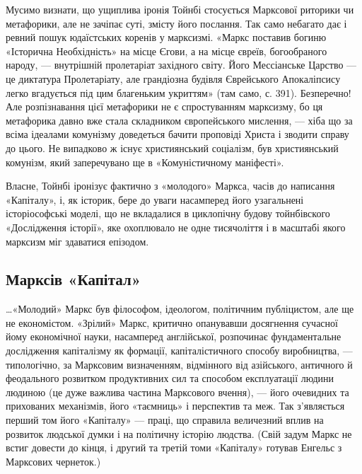 Мусимо визнати, що ущиплива іронія Тойнбі стосується Марксової 
риторики чи метафорики, але не зачіпає суті, змісту його послання. Так 
само небагато дає і ревний пошук юдаїстських коренів у марксизмі. 
«Маркс поставив богиню «Історична Необхідність» на місце Єгови, а на 
місце євреїв, богообраного народу, — внутрішній пролетаріат 
західного світу. Його Мессіанське Царство — це диктатура 
Пролетаріату, але грандіозна будівля Єврейського Апокаліпсису легко 
вгадується під цим благеньким укриттям» (там само, с. 391). Безперечно! 
Але розпізнавання цієї метафорики не є спростуванням марксизму, бо ця 
метафорика давно вже стала складником європейського мислення, — хіба 
що за всіма ідеалами комунізму доведеться бачити проповіді Христа і 
зводити справу до цього. Не випадково ж існує християнський соціалізм, 
був християнський комунізм, який заперечувано ще в «Комуністичному 
маніфесті». 


Власне, Тойнбі іронізує фактично з «молодого» Маркса, часів до 
написання «Капіталу», і, як історик, бере до уваги насамперед його 
узагальнені історіософські моделі, що не вкладалися в циклопічну 
будову тойнбівского «Дослідження історії», яке охоплювало не одне 
тисячоліття і в масштабі якого марксизм міг здаватися епізодом.


\subsection*{Марксів «Капітал»}


\ldots{}«Молодий» Маркс був філософом, ідеологом, політичним публіцистом, 
але ще не економістом. «Зрілий» Маркс, критично опанувавши досягнення 
сучасної йому економічної науки, насамперед англійської, розпочинає 
фундаментальне дослідження капіталізму як формації, 
капіталістичного способу виробництва, — типологічно, за Марксовим 
визначенням, відмінного від азійського, античного й феодального 
розвитком продуктивних сил та способом експлуатації людини людиною 
(це дуже важлива частина Марксового вчення), — його очевидних та 
прихованих механізмів, його «таємниць» і перспектив та меж. Так 
з'являється перший том його «Капіталу» — праці, що справила 
величезний вплив на розвиток людської думки і на політичну історію 
людства. (Свій задум Маркс не встиг довести до кінця, і другий та третій 
томи «Капіталу» готував Енгельс з Марксових чернеток.)  


